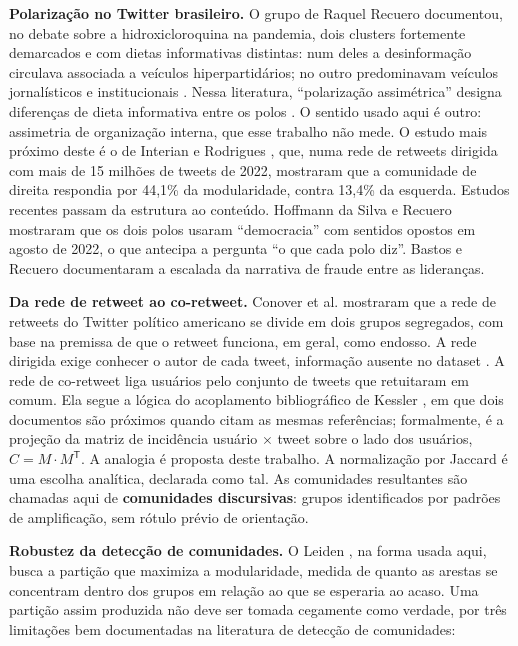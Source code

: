 \documentclass[12pt,a4paper,oneside]{article}
\begin{document}
\textbf{Polarização no Twitter brasileiro.} O grupo de Raquel Recuero documentou, no debate sobre a hidroxicloroquina na pandemia, dois clusters fortemente demarcados e com dietas informativas distintas: num deles a desinformação circulava associada a veículos hiperpartidários; no outro predominavam veículos jornalísticos e institucionais \cite{recuero2021}. Nessa literatura, ``polarização assimétrica'' designa diferenças de dieta informativa entre os polos \cite{recuero2021}. O sentido usado aqui é outro: assimetria de organização interna, que esse trabalho não mede. O estudo mais próximo deste é o de Interian e Rodrigues \cite{interian2023}, que, numa rede de retweets dirigida com mais de 15 milhões de tweets de 2022, mostraram que a comunidade de direita respondia por 44,1\% da modularidade, contra 13,4\% da esquerda. Estudos recentes passam da estrutura ao conteúdo. Hoffmann da Silva e Recuero \cite{hoffmann2025} mostraram que os dois polos usaram ``democracia'' com sentidos opostos em agosto de 2022, o que antecipa a pergunta ``o que cada polo diz''. Bastos e Recuero \cite{bastos2023} documentaram a escalada da narrativa de fraude entre as lideranças.

\textbf{Da rede de retweet ao co-retweet.} Conover et al. \cite{conover2011} mostraram que a rede de retweets do Twitter político americano se divide em dois grupos segregados, com base na premissa de que o retweet funciona, em geral, como endosso. A rede dirigida exige conhecer o autor de cada tweet, informação ausente no dataset \cite{alabarse2024}. A rede de co-retweet liga usuários pelo conjunto de tweets que retuitaram em comum. Ela segue a lógica do acoplamento bibliográfico de Kessler \cite{kessler1963}, em que dois documentos são próximos quando citam as mesmas referências; formalmente, é a projeção da matriz de incidência usuário $\times$ tweet sobre o lado dos usuários, $C = M \cdot M^{\mathsf{T}}$. A analogia é proposta deste trabalho. A normalização por Jaccard é uma escolha analítica, declarada como tal. As comunidades resultantes são chamadas aqui de \textbf{comunidades discursivas}: grupos identificados por padrões de amplificação, sem rótulo prévio de orientação.

\textbf{Robustez da detecção de comunidades.} O Leiden \cite{traag2019}, na forma usada aqui, busca a partição que maximiza a modularidade, medida de quanto as arestas se concentram dentro dos grupos em relação ao que se esperaria ao acaso. Uma partição assim produzida não deve ser tomada cegamente como verdade, por três limitações bem documentadas na literatura de detecção de comunidades:
\end{document}
